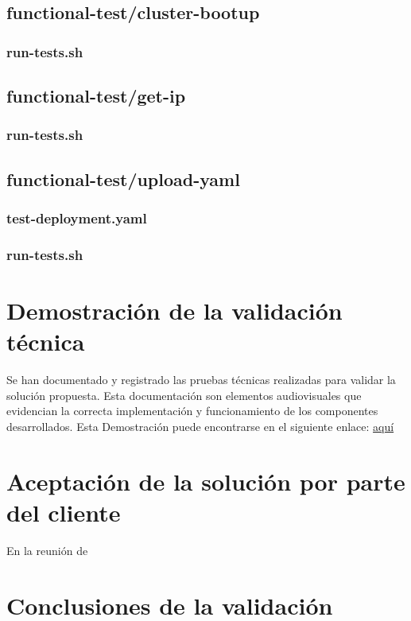 \subsection{functional-test/cluster-bootup}
\noindent

\subsubsection{run-tests.sh}
\noindent




\subsection{functional-test/get-ip}
\noindent

\subsubsection{run-tests.sh}
\noindent





\subsection{functional-test/upload-yaml}

\subsubsection{test-deployment.yaml}
\noindent



\subsubsection{run-tests.sh}
\noindent



\section{Demostración de la validación técnica}
\noindent
Se han documentado y registrado las pruebas técnicas realizadas para validar la solución propuesta. Esta documentación son elementos audiovisuales que evidencian la correcta implementación y funcionamiento de los componentes desarrollados. Esta Demostración puede encontrarse en el siguiente enlace: \href{https://drive.google.com/drive/folders/1UgpmFmz7E2uYxv_FCGCpYArZDIMc0nxv?usp=sharing}{aquí}


\section{Aceptación de la solución por parte del cliente}
\noindent
En la reunión de 

\section{Conclusiones de la validación}
